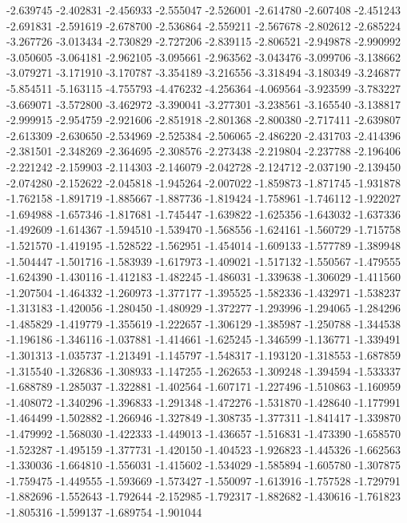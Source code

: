 -2.639745
-2.402831
-2.456933
-2.555047
-2.526001
-2.614780
-2.607408
-2.451243
-2.691831
-2.591619
-2.678700
-2.536864
-2.559211
-2.567678
-2.802612
-2.685224
-3.267726
-3.013434
-2.730829
-2.727206
-2.839115
-2.806521
-2.949878
-2.990992
-3.050605
-3.064181
-2.962105
-3.095661
-2.963562
-3.043476
-3.099706
-3.138662
-3.079271
-3.171910
-3.170787
-3.354189
-3.216556
-3.318494
-3.180349
-3.246877
-5.854511
-5.163115
-4.755793
-4.476232
-4.256364
-4.069564
-3.923599
-3.783227
-3.669071
-3.572800
-3.462972
-3.390041
-3.277301
-3.238561
-3.165540
-3.138817
-2.999915
-2.954759
-2.921606
-2.851918
-2.801368
-2.800380
-2.717411
-2.639807
-2.613309
-2.630650
-2.534969
-2.525384
-2.506065
-2.486220
-2.431703
-2.414396
-2.381501
-2.348269
-2.364695
-2.308576
-2.273438
-2.219804
-2.237788
-2.196406
-2.221242
-2.159903
-2.114303
-2.146079
-2.042728
-2.124712
-2.037190
-2.139450
-2.074280
-2.152622
-2.045818
-1.945264
-2.007022
-1.859873
-1.871745
-1.931878
-1.762158
-1.891719
-1.885667
-1.887736
-1.819424
-1.758961
-1.746112
-1.922027
-1.694988
-1.657346
-1.817681
-1.745447
-1.639822
-1.625356
-1.643032
-1.637336
-1.492609
-1.614367
-1.594510
-1.539470
-1.568556
-1.624161
-1.560729
-1.715758
-1.521570
-1.419195
-1.528522
-1.562951
-1.454014
-1.609133
-1.577789
-1.389948
-1.504447
-1.501716
-1.583939
-1.617973
-1.409021
-1.517132
-1.550567
-1.479555
-1.624390
-1.430116
-1.412183
-1.482245
-1.486031
-1.339638
-1.306029
-1.411560
-1.207504
-1.464332
-1.260973
-1.377177
-1.395525
-1.582336
-1.432971
-1.538237
-1.313183
-1.420056
-1.280450
-1.480929
-1.372277
-1.293996
-1.294065
-1.284296
-1.485829
-1.419779
-1.355619
-1.222657
-1.306129
-1.385987
-1.250788
-1.344538
-1.196186
-1.346116
-1.037881
-1.414661
-1.625245
-1.346599
-1.136771
-1.339491
-1.301313
-1.035737
-1.213491
-1.145797
-1.548317
-1.193120
-1.318553
-1.687859
-1.315540
-1.326836
-1.308933
-1.147255
-1.262653
-1.309248
-1.394594
-1.533337
-1.688789
-1.285037
-1.322881
-1.402564
-1.607171
-1.227496
-1.510863
-1.160959
-1.408072
-1.340296
-1.396833
-1.291348
-1.472276
-1.531870
-1.428640
-1.177991
-1.464499
-1.502882
-1.266946
-1.327849
-1.308735
-1.377311
-1.841417
-1.339870
-1.479992
-1.568030
-1.422333
-1.449013
-1.436657
-1.516831
-1.473390
-1.658570
-1.523287
-1.495159
-1.377731
-1.420150
-1.404523
-1.926823
-1.445326
-1.662563
-1.330036
-1.664810
-1.556031
-1.415602
-1.534029
-1.585894
-1.605780
-1.307875
-1.759475
-1.449555
-1.593669
-1.573427
-1.550097
-1.613916
-1.757528
-1.729791
-1.882696
-1.552643
-1.792644
-2.152985
-1.792317
-1.882682
-1.430616
-1.761823
-1.805316
-1.599137
-1.689754
-1.901044
